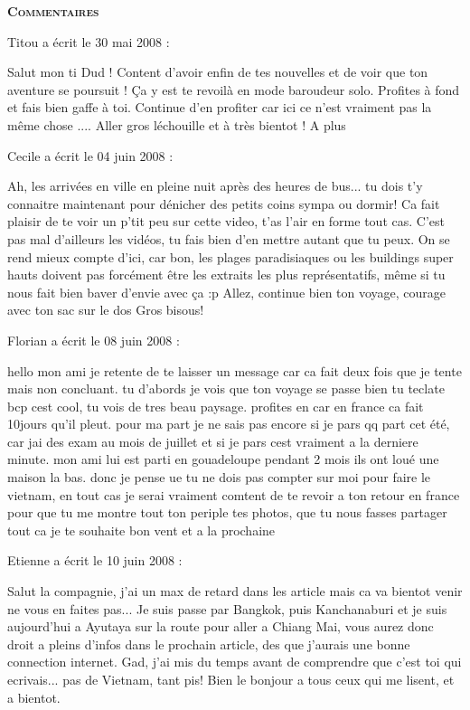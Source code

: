 \bigskip
\textbf{\textsc{Commentaires}}

 \medskip
Titou a écrit le 30 mai 2008 :
\begin{displayquote}
Salut mon ti Dud !
Content d'avoir enfin de tes nouvelles et de voir que ton aventure se poursuit ! Ça y est te revoilà en mode baroudeur solo. Profites à fond et fais bien gaffe à toi.
Continue d'en profiter car ici ce n'est vraiment pas la même chose ....
Aller gros léchouille et à très bientot !
A plus
\end{displayquote}

 \medskip
Cecile a écrit le 04 juin 2008 :
\begin{displayquote}
Ah, les arrivées en ville en pleine nuit après des heures de bus... tu dois t'y connaitre maintenant pour dénicher des petits coins sympa ou dormir!
Ca fait plaisir de te voir un p'tit peu sur cette video, t'as l'air en forme tout cas. C'est pas mal d'ailleurs les vidéos, tu fais bien d'en mettre autant que tu peux. On se rend mieux compte d'ici, car bon, les plages paradisiaques ou les buildings super hauts doivent pas forcément être les extraits les plus représentatifs, même si tu nous fait bien baver d'envie avec ça :p
Allez, continue bien ton voyage, courage avec ton sac sur le dos
Gros bisous!
\end{displayquote}

 \medskip
Florian a écrit le 08 juin 2008 :
\begin{displayquote}
hello mon ami
je retente de te laisser un message car ca fait deux fois que je tente mais non concluant. tu d'abords je vois que ton voyage se passe bien tu teclate bcp cest cool, tu vois de tres beau paysage. profites en car en france ca fait 10jours qu'il pleut.
pour ma part je ne sais pas encore si je pars qq part cet été, car jai des exam au mois de juillet et si je pars cest vraiment a la derniere minute.
mon ami lui est parti en gouadeloupe pendant 2 mois ils ont loué une maison la bas.
donc je pense ue tu ne dois pas compter sur moi pour faire le vietnam, en tout cas je serai vraiment comtent de te revoir a ton retour en france pour que tu me montre tout ton periple tes photos, que tu nous fasses partager tout ca
je te souhaite bon vent et a la prochaine
\end{displayquote}

 \medskip
Etienne a écrit le 10 juin 2008 :
\begin{displayquote}
Salut la compagnie, j'ai un max de retard dans les article mais ca va bientot venir ne vous en faites pas...
Je suis passe par Bangkok, puis Kanchanaburi et je suis aujourd'hui a Ayutaya sur la route pour aller a Chiang Mai, vous aurez donc droit a pleins d'infos dans le prochain article, des que j'aurais une bonne connection internet.
Gad, j'ai mis du temps avant de comprendre que c'est toi qui ecrivais... pas de Vietnam, tant pis!
Bien le bonjour a tous ceux qui me lisent, et a bientot.
\end{displayquote}

